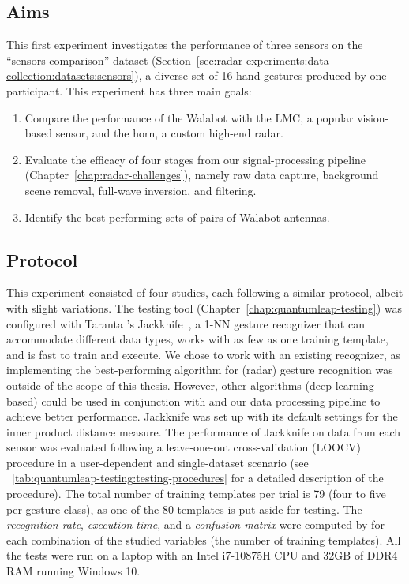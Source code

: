\subsection{Aims} \label{sec:radar-experiments:sensors:aims}
This first experiment investigates the performance of three sensors on the ``sensors comparison'' dataset (Section~\ref{sec:radar-experiments:data-collection:datasets:sensors}), a diverse set of 16 hand gestures produced by one participant. This experiment has three main goals:
\begin{enumerate}
    \item Compare the performance of the Walabot with the LMC, a popular vision-based sensor, and the horn, a custom high-end radar.
    \item Evaluate the efficacy of four stages from our signal-processing pipeline (Chapter~\ref{chap:radar-challenges}), namely raw data capture, background scene removal, full-wave inversion, and filtering.
    \item Identify the best-performing sets of pairs of Walabot antennas.
\end{enumerate}

\subsection{Protocol} \label{sec:radar-experiments:sensors:protocol}
This experiment consisted of four studies, each following a similar protocol, albeit with slight variations.
%
The \ql testing tool (Chapter~\ref{chap:quantumleap-testing}) was configured with Taranta \etal's Jackknife~\cite{Taranta:2017}, a 1-NN gesture recognizer that can accommodate different data types, works with as few as one training template, and is fast to train and execute. We chose to work with an existing recognizer, as implementing the best-performing algorithm for (radar) gesture recognition was outside of the scope of this thesis. However, other algorithms (\eg deep-learning-based) could be used in conjunction with \ql and our data processing pipeline to achieve better performance. Jackknife was set up with its default settings for the inner product distance measure. 
%
The performance of Jackknife on data from each sensor was evaluated following a leave-one-out cross-validation (LOOCV) procedure in a user-dependent and single-dataset scenario (see \tab~\ref{tab:quantumleap-testing:testing-procedures} for a detailed description of the procedure). 
The total number of training templates per trial is 79 (four to five per gesture class), as one of the 80 templates is put aside for testing.
The \textit{recognition rate}, \textit{execution time}, and a \textit{confusion matrix} were computed by \ql for each combination of the studied variables (\eg the number of training templates).
All the tests were run on a laptop with an Intel i7-10875H CPU and 32GB of DDR4 RAM running Windows 10.

